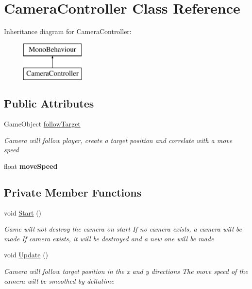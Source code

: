 \hypertarget{class_camera_controller}{}\section{Camera\+Controller Class Reference}
\label{class_camera_controller}
Inheritance diagram for Camera\+Controller\+:\begin{figure}[H]
\begin{center}
\leavevmode
\includegraphics[height=2.000000cm]{class_camera_controller}
\end{center}
\end{figure}
\subsection*{Public Attributes}
\begin{DoxyCompactItemize}
\item 
Game\+Object \mbox{\hyperlink{class_camera_controller_a1bfdfa348a7f9bb2c8d511d9ee3435b9}{follow\+Target}}
\begin{DoxyCompactList}\small\item\em Camera will follow player, create a target position and correlate with a move speed \end{DoxyCompactList}\item 
\mbox{\label{class_camera_controller_a8979cceb75638fe3caf62c8516ec4bc6}} 
float {\bfseries move\+Speed}
\end{DoxyCompactItemize}
\subsection*{Private Member Functions}
\begin{DoxyCompactItemize}
\item 
void \mbox{\hyperlink{class_camera_controller_ad4a238c6f7db3ee003302a245d860860}{Start}} ()
\begin{DoxyCompactList}\small\item\em Game will not destroy the camera on start If no camera exists, a camera will be made If camera exists, it will be destroyed and a new one will be made \end{DoxyCompactList}\item 
void \mbox{\hyperlink{class_camera_controller_a7c4f486f4bcbd1d54a346fdce9707bd5}{Update}} ()
\begin{DoxyCompactList}\small\item\em Camera will follow target position in the x and y directions The move speed of the camera will be smoothed by deltatime \end{DoxyCompactList}\end{DoxyCompactItemize}
